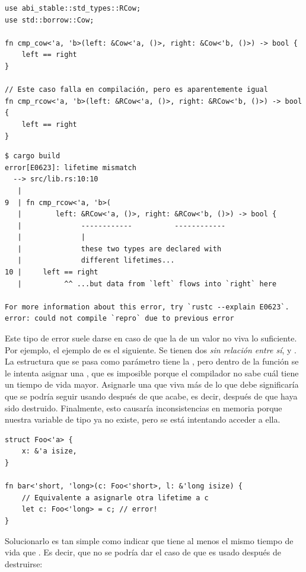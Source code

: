 \begin{verbatim}
use abi_stable::std_types::RCow;
use std::borrow::Cow;

fn cmp_cow<'a, 'b>(left: &Cow<'a, ()>, right: &Cow<'b, ()>) -> bool {
    left == right
}

// Este caso falla en compilación, pero es aparentemente igual
fn cmp_rcow<'a, 'b>(left: &RCow<'a, ()>, right: &RCow<'b, ()>) -> bool {
    left == right
}
\end{verbatim}

\begin{verbatim}
$ cargo build
error[E0623]: lifetime mismatch
  --> src/lib.rs:10:10
   |
9  | fn cmp_rcow<'a, 'b>(
   |        left: &RCow<'a, ()>, right: &RCow<'b, ()>) -> bool {
   |              ------------          ------------
   |              |
   |              these two types are declared with
   |              different lifetimes...
10 |     left == right
   |          ^^ ...but data from `left` flows into `right` here

For more information about this error, try `rustc --explain E0623`.
error: could not compile `repro` due to previous error
\end{verbatim}

Este tipo de error suele darse en caso de que la \lifetime de un valor no viva
lo suficiente. Por ejemplo, el ejemplo de  es el
siguiente. Se tienen dos \lifetimes \emph{sin relación entre sí}, 
y . La estructura  que se pasa como parámetro tiene la
\lifetime {}, pero dentro de la función se le intenta asignar una
\lifetime {}, que es imposible porque el compilador no sabe cuál tiene
un tiempo de vida mayor. Asignarle una \lifetime que viva más de lo que debe
significaría que se podría seguir usando  después de que 
acabe, es decir, después de que  haya sido destruido. Finalmente, esto
causaría inconsistencias en memoria porque nuestra variable de tipo 
ya no existe, pero se está intentando acceder a ella.

\begin{verbatim}
struct Foo<'a> {
    x: &'a isize,
}

fn bar<'short, 'long>(c: Foo<'short>, l: &'long isize) {
    // Equivalente a asignarle otra lifetime a c
    let c: Foo<'long> = c; // error!
}
\end{verbatim}

Solucionarlo es tan simple como indicar que  tiene al menos el
mismo tiempo de vida que . Es decir, que no se podría dar el caso de
que  es usado después de destruirse:

